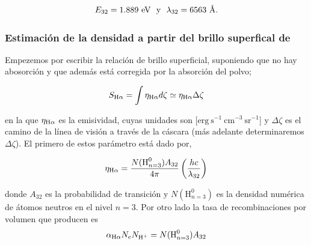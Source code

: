 \begin{equation}
 \label{eq:values-energy-landa}
  E_{32} = 1.889~\text{eV}  ~~ \text{y} ~~
  \lambda_{32} = 6563~\text{\AA{}}{}.
 \end{equation}

\subsubsection{Estimación de la densidad a partir del brillo superfical de \ha{} }
\label{sec:brillo}

Empezemos por escribir la relación de brillo superficial, suponiendo que no hay abosorción y que además está corregida por la absorción del polvo;

\begin{equation}
  \label{eq:brillo}
  S_{\mathrm{H}\alpha{}} = \int \eta_{\mathrm{H}\alpha{}} d\zeta \simeq \eta_{\mathrm{H}\alpha{}} \Delta \zeta
\end{equation}  

\noindent en la que  \(\eta_{\mathrm{H}\alpha{}}\) es la emisividad, cuyas unidades son [\(\mathrm{erg~s^{-1}~cm^{-3}~sr^{-1}}\)] y \(\Delta \zeta\) es el camino de la línea de visión a través de la cáscara (más adelante determinaremos \(\Delta \zeta\)). El primero de estos parámetro está dado por,

  \begin{equation}
    \label{eq:emision-coeficiente}
    \eta_{\mathrm{H}\alpha} = \frac{N(\text{H}^0_{n=3})A_{32}}{4 \pi} \left(\frac{hc}{\lambda_{32}}\right) 
  \end{equation}

donde \(A_{32}\) es la probabilidad de transición y \(N(\text{H}^0_{n=3})\) es la densidad numérica de átomos neutros en el nivel \(n=3\). Por otro lado la tasa de recombinaciones por volumen que producen \ha{} es 
\begin{equation}
  \label{eq:recombinaciones}
  \alpha_{\mathrm{H}\alpha} N_{e}N_{\text{H}^{+}}=N(\text{H}^0_{n=3})A_{32}
\end{equation}

